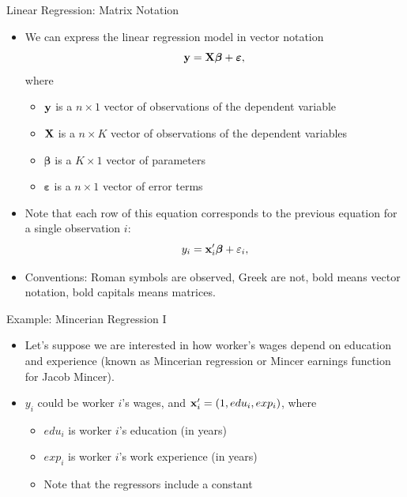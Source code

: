 \begin{frame}{Linear Regression: Matrix Notation}
	\begin{itemize}
	\item We can express the linear regression model in vector notation
	\begin{equation*}
		{\bf y}= {\bf X} \boldsymbol{\beta} + \boldsymbol{\varepsilon},
	\end{equation*}
	where 
	\begin{itemize}
		\item ${\bf y}$ is a $n\times 1$ vector of observations of the dependent variable
		\item ${\bf X}$ is a $n\times K$ vector of observations of the dependent variables
		\item $\boldsymbol{\beta} $ is a $K\times 1$ vector of parameters
		\item $\boldsymbol{\varepsilon}$ is a $n\times 1$ vector of error terms
	\end{itemize}

	\item Note that each row of this equation corresponds to the previous equation for
	a single observation $i$:\[
	y_i = {\bf x}_{i}'\boldsymbol{\beta} + \varepsilon_i,
	\]

	\item Conventions: Roman symbols are observed, Greek are not, bold means vector notation, 
	bold capitals means matrices.
\end{itemize}
\end{frame}

\begin{frame}{Example: Mincerian Regression I}
\begin{itemize}
	\item Let's suppose we are interested in how worker's wages depend on education and experience
	(known as Mincerian regression or Mincer earnings function for Jacob Mincer).

	\medskip
	\item $y_{i}$ could be worker $i$'s wages, and ${\bf x}_i' = \left(1,edu_i,exp_i \right)$, 
	where 
	\begin{itemize}
		\item $edu_i$ is worker $i$'s education (in years)
		\item $exp_i$ is worker $i$'s work experience (in years)
		\item Note that the regressors include a constant 
	\end{itemize}
\end{itemize}
\end{frame}

